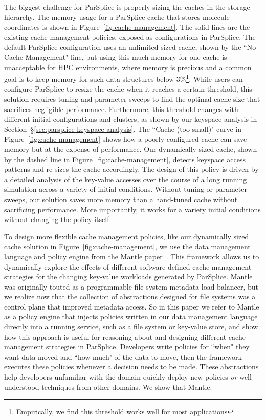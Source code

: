 The biggest challenge for ParSplice is properly sizing the caches in the
storage hierarchy.  The memory usage for a ParSplice cache that stores molecule
coordinates is shown in Figure~\ref{fig:cache-management}. The solid lines are
the existing cache management policies, exposed as configurations in ParSplice.
The default ParSplice configuration uses an unlimited sized cache, shown by the
``No Cache Management" line, but using this much memory for one cache is
unacceptable for HPC environments, where memory is precious and a common goal
is to keep memory for such data structures below 3\%\footnote{Empirically, we
find this threshold works well for most applications}.  While users can
configure ParSplice to resize the cache when it reaches a certain threshold,
this solution requires tuning and parameter sweeps to find the optimal cache
size that sacrifices negligible performance.  Furthermore, this threshold
changes with different initial configurations and clusters, as shown by our
keyspace analysis in Section~\S\ref{sec:parsplice-keyspace-analysis}.  The
``Cache (too small)" curve in Figure~\ref{fig:cache-management} shows how a
poorly configured cache can save memory but at the expense of performance.  Our
dynamically sized cache, shown by the dashed line in
Figure~\ref{fig:cache-management}, detects keyspace access patterns and
re-sizes the cache accordingly. The design of this policy is driven by a
detailed analysis of the key-value accesses over the course of a long running
simulation across a variety of initial conditions.  Without tuning or parameter
sweeps, our solution saves more memory than a hand-tuned cache without
sacrificing performance.  More importantly, it works for a variety initial
conditions without changing the policy itself.

To design more flexible cache management policies, like our dynamically sized
cache solution in Figure~\ref{fig:cache-management}, we use the data management
language and policy engine from the Mantle paper~\cite{sevilla:sc15-mantle}.
This framework allows us to dynamically explore the effects of different
software-defined cache management strategies for the changing key-value
workloads generated by ParSplice.  Mantle was originally touted as a
programmable file system metadata load balancer, but we realize now that the
collection of abstractions designed for file systems was a control plane that
improved metadata access. So in this paper we refer to Mantle as a policy
engine that injects policies written in our data management language directly
into a running service, such as a file system or key-value store, and show how
this approach is useful for reasoning about and designing different cache
management strategies in ParSplice.  Developers write policies for ``when" they
want data moved and ``how much" of the data to move, then the framework
executes these policies whenever a decision needs to be made.  These
abstractions help developers unfamiliar with the domain quickly deploy new
policies {\it or} well-understood techniques from other domains.  We show that
Mantle:

